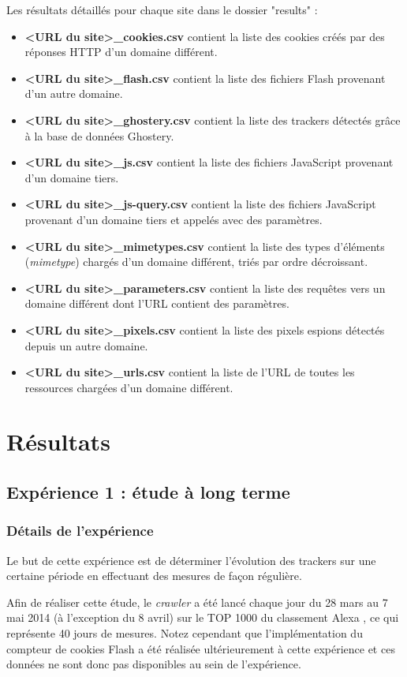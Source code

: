 Les résultats détaillés pour chaque site dans le dossier "results" :
\begin{itemize}
	\item \textbf{<URL du site>\_cookies.csv} contient la liste des cookies créés par des réponses HTTP d'un domaine différent.
	\item \textbf{<URL du site>\_flash.csv} contient la liste des fichiers Flash provenant d'un autre domaine.
	\item \textbf{<URL du site>\_ghostery.csv} contient la liste des trackers détectés grâce à la base de données Ghostery.
	\item \textbf{<URL du site>\_js.csv} contient la liste des fichiers JavaScript provenant d'un domaine tiers.
	\item \textbf{<URL du site>\_js-query.csv} contient la liste des fichiers JavaScript provenant d'un domaine tiers et appelés avec des paramètres.
	\item \textbf{<URL du site>\_mimetypes.csv} contient la liste des types d'éléments (\textit{mimetype}) chargés d'un domaine différent, triés par ordre décroissant.
	\item \textbf{<URL du site>\_parameters.csv} contient la liste des requêtes vers un domaine différent dont l'URL contient des paramètres.
	\item \textbf{<URL du site>\_pixels.csv} contient la liste des pixels espions détectés depuis un autre domaine.
	\item \textbf{<URL du site>\_urls.csv} contient la liste de l'URL de toutes les ressources chargées d'un domaine différent.
	\newline
\end{itemize}

\section{Résultats}

\subsection{Expérience 1 : étude à long terme}
\subsubsection{Détails de l'expérience}
Le but de cette expérience est de déterminer l'évolution des trackers sur une certaine période en effectuant des mesures de façon régulière.

Afin de réaliser cette étude, le \textit{crawler} a été lancé chaque jour du 28 mars au 7 mai 2014 (à l'exception du 8 avril) sur le TOP 1000 du classement Alexa \cite{AlexaTop}, ce qui représente 40 jours de mesures. Notez cependant que l'implémentation du compteur de cookies Flash a été réalisée ultérieurement à cette expérience et ces données ne sont donc pas disponibles au sein de l'expérience.
\newline

